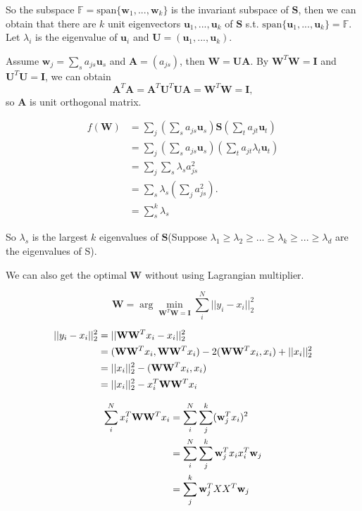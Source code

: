 	So the subspace $\mathbb F=\text{span}\{\mathbf w_1,...,\mathbf w_k \} $ is the invariant subspace of $\mathbf S$, then we can obtain that there are $k$ unit eigenvectors $\mathbf u_1,...,\mathbf u_k$ of $\mathbf S$ s.t. $\text{span}\{\mathbf u_1,...,\mathbf u_k \}=\mathbb F$.
	Let $\lambda_i$ is the eigenvalue of $\mathbf u_i$ and $\mathbf U=(\mathbf u_1,...,\mathbf u_k)$.
	
	Assume $\mathbf w_j=\sum_s a_{js} \mathbf u_s$ and $\mathbf A=(a_{js})$, then $\mathbf W=\mathbf U\mathbf A$. By $\mathbf W^T\mathbf W=\mathbf I$ and $\mathbf U^T\mathbf U=\mathbf I$, we can obtain $$\mathbf A^T\mathbf A=\mathbf A^T\mathbf U^T\mathbf U\mathbf A=\mathbf W^T\mathbf W=\mathbf I,$$ so $\mathbf A$ is unit orthogonal matrix.
	
	\begin{align}
	f(\mathbf W)&=\sum_j (\sum_s a_{js}\mathbf u_s)\mathbf S (\sum_t a_{jt}\mathbf u_t)\\
	 &=\sum_j (\sum_s a_{js}\mathbf u_s) (\sum_t a_{jt}\lambda_t\mathbf u_t)\\
	 &=\sum_j \sum_s \lambda_s a_{js}^2\\
	 &=\sum_s \lambda_s (\sum_j a_{js}^2 ).\\
	 &=\sum_s^k \lambda_s
	\end{align}
	
	So $\lambda_s$ is the largest $k$ eigenvalues of $\mathbf S$(Suppose $\lambda_1 \geq \lambda_2 \geq ...\geq \lambda_k \geq...\geq \lambda_d$ are the eigenvalues of S).
	
We can also get the optimal $\mathbf W$ without using Lagrangian multiplier. 

	\begin{equation}
	\mathbf W=\arg\min_{\mathbf W^T\mathbf W=\mathbf I}\sum_i^N ||y_i-x_i||_2^2
	\end{equation}
	
	\begin{align}
	||y_i-x_i||_2^2&=||\mathbf W\mathbf W^T x_i-x_i||_2^2\\\notag
	&=(\mathbf W\mathbf W^T x_i, \mathbf W\mathbf W^T x_i)-2(\mathbf W\mathbf W^T x_i,x_i)+||x_i||_2^2  \\\notag
	&=||x_i||_2^2-(\mathbf W\mathbf W^T x_i,x_i)  \\\notag
	&=||x_i||_2^2-x_i^T\mathbf W\mathbf W^T x_i  
	\end{align}
	
	\begin{align}
	\sum_i^N x_i^T\mathbf W\mathbf W^T x_i &=  \sum_i^N \sum_j^k (\mathbf w_j^T x_i)^2 \\\notag
	&=  \sum_i^N \sum_j^k \mathbf w_j^T x_i x_i^T \mathbf w_j\\\notag
	&=  \sum_j^k \mathbf w_j^T XX^T \mathbf w_j
	\end{align}
	
